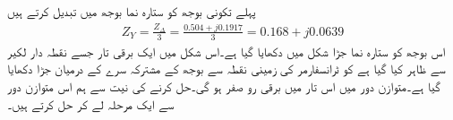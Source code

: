 پہلے تکونی بوجھ کو ستارہ نما بوجھ میں تبدیل کرتے ہیں
\begin{align*}
Z_Y= \frac{Z_\Delta}{3}=\frac{0.504+j0.1917}{3}=0.168+j0.0639
\end{align*}
اس بوجھ کو ستارہ نما جڑا شکل  میں دکھایا گیا ہے۔اس شکل میں ایک برقی تار جسے نقطہ دار لکیر سے ظاہر کیا گیا ہے کو ٹرانسفارمر کی زمینی نقطہ سے بوجھ کے مشترکہ سرے کے درمیان جڑا دکھایا گیا ہے۔متوازن دور میں اس تار میں برقی رو صفر ہو گی۔حل کرنے کی نیت سے ہم اس متوازن دور سے ایک مرحلہ لے کر حل کرتے ہیں۔
\begin{figure}
\centering
\end{figure}
